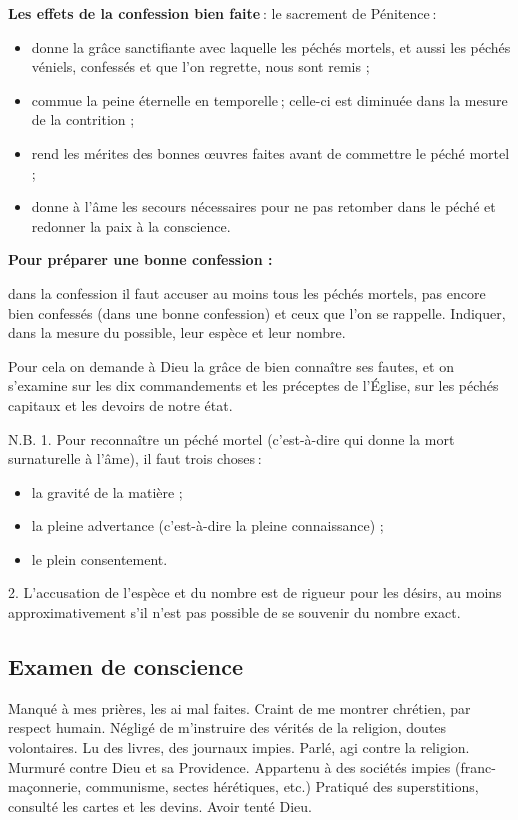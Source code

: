 \smallskip
\textbf{Les effets de la confession bien faite} : le sacrement de Pénitence :
\begin{itemize}
\item donne la grâce sanctifiante avec laquelle les péchés mortels, et aussi les péchés véniels, confessés et que l'on regrette, nous sont remis ;
\item commue la peine éternelle en temporelle ; celle-ci est diminuée dans la mesure de la contrition ;
\item rend les mérites des bonnes œuvres faites avant de commettre le péché
mortel ;
\item donne à l’âme les secours nécessaires pour ne pas retomber dans le péché et redonner la paix à la conscience.
\end{itemize}

\smallskip
\textbf{Pour préparer une bonne confession :}

dans la confession il faut accuser au moins tous les péchés mortels, pas encore bien confessés (dans une bonne confession) et ceux que l’on se rappelle. Indiquer, dans la mesure du possible, leur espèce et leur nombre.

Pour cela on demande à Dieu la grâce de bien connaître ses fautes, et on s’examine sur les dix commandements et les préceptes de l’Église, sur les péchés capitaux et les devoirs de notre état.

N.B. 1. Pour reconnaître un péché mortel (c’est-à-dire qui donne la mort surnaturelle à l’âme), il faut trois choses :
\begin{itemize}
\item la gravité de la matière ;
\item la pleine advertance (c’est-à-dire la pleine connaissance) ;
\item le plein consentement.
\end{itemize}

2. L’accusation de l’espèce et du nombre est de rigueur pour les désirs, au moins approximativement s'il n'est pas possible de se souvenir du nombre exact.


\subsection*{Examen de conscience}



Manqué à mes prières, les ai mal faites.
Craint de me montrer chrétien, par respect humain. Négligé de m’instruire des
vérités de la religion, doutes volontaires.
Lu des livres, des journaux impies. Parlé,
agi contre la religion. Murmuré contre
Dieu et sa Providence. Appartenu à des
sociétés impies (franc-maçonnerie, communisme, sectes hérétiques, etc.) Pratiqué
des superstitions, consulté les cartes et les
devins. Avoir tenté Dieu.

